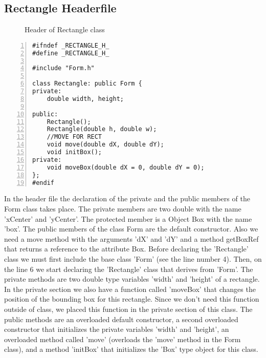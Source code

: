 \documentclass{article}
\begin{document}
\subsection{Rectangle Headerfile}
\begin{figure}
\scriptsize{\caption{Header of Rectangle class}}
\end{figure}
\begin{lstlisting}[basicstyle=\footnotesize\ttfamily, numbers=left, stepnumber=1, numberstyle = \normalsize]
#ifndef _RECTANGLE_H_
#define _RECTANGLE_H_

#include "Form.h"

class Rectangle: public Form {
private:
	double width, height; 

public:
	Rectangle();
	Rectangle(double h, double w);
	//MOVE FOR RECT
	void move(double dX, double dY);
	void initBox();
private:
	void moveBox(double dX = 0, double dY = 0);	
};
#endif
\end{lstlisting}
\normalsize{In the header file the declaration of the private and the public members of the Form class takes place.\newline
The private members are two double with the name 'xCenter' and 'yCenter'.
The protected member is a Object Box with the name 'box'.
The public members of the class Form are the default constructor.\newline 
Also we need a move method with the arguments 'dX' and 'dY' and a method getBoxRef that returns a reference to the attribute Box.\newline
\newline
\newline
Before declaring the 'Rectangle' class we must first include the base class 'Form' (see the line number 4). Then, on the line 6 we start declaring the 'Rectangle' class that derives from 'Form'.
The private methods are two double type variables 'width' and 'height' of a rectangle. In the private section we also have a function called 'moveBox' that changes the position of the bounding box for this rectangle. Since we don't need this function outside of class, we placed this function in the private section of this class. 
The public methods are an overloaded default constructor, a second overloaded constructor that initializes the private variables 'width' and 'height', an overloaded method called 'move' (overloads the 'move' method in the Form class), and a method 'initBox' that initializes the 'Box' type object for this class. 
	
}\newpage
\end{document}
